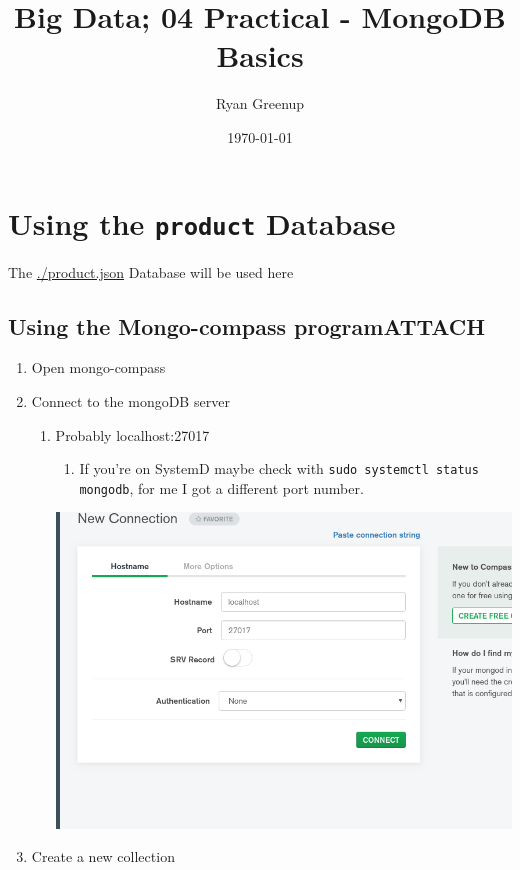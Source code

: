\documentclass[11pt]{article}
\author{Ryan Greenup}
\date{\today}
\title{Big Data; 04 Practical - MongoDB Basics}
\begin{document}
\maketitle
\tableofcontents

\section{Using the \texttt{product} Database}
\label{sec:org6fad599}
The \url{./product.json} Database will be used here
\subsection{Using the Mongo-compass program\hfill{}\textsc{ATTACH}}
\label{sec:org4b889ba}
\begin{enumerate}
\item Open mongo-compass

\item Connect to the mongoDB server

\begin{enumerate}
\item Probably localhost:27017

\begin{enumerate}
\item If you're on SystemD maybe check with \texttt{sudo systemctl status mongodb}, for me I got a different port number.
\end{enumerate}

\begin{center}
\includegraphics[width=.9\linewidth]{org-compass-Server.png}
\end{center}
\end{enumerate}

\item Create a new collection


\end{enumerate}
\end{document}
